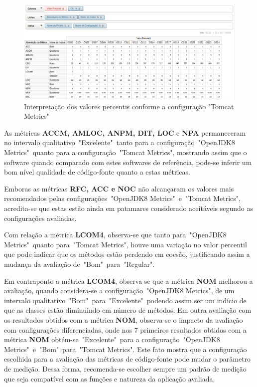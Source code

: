 \begin{figure}
\centering
\includegraphics[keepaspectratio=true,scale=0.7]{figuras/total-tomcat.eps}
\caption{Interpretação dos valores percentis conforme a configuração "Tomcat Metrics"}
\label{fig:total-tomcat}
\end{figure}
\FloatBarrier

As métricas \textbf{ACCM, AMLOC, ANPM, DIT, LOC} e \textbf{NPA} permaneceram no intervalo qualitativo~"Excelente"~tanto para a configuração~"OpenJDK8 Metrics"~quanto para a configuração~"Tomcat Metrics", mostrando assim que o software quando comparado com estes softwares de referência, pode-se inferir um bom nível qualidade de código-fonte quanto a estas métricas.

Emboras as métricas \textbf{RFC, ACC e NOC} não alcançaram os valores mais recomendados pelas configurações~"OpenJDK8 Metrics"~e~"Tomcat Metrics", acredita-se que estas estão ainda em patamares considerado aceitáveis segundo as configurações avaliadas. 

Com relação a métrica \textbf{LCOM4}, observa-se que tanto para~"OpenJDK8 Metrics"~quanto para~"Tomcat Metrics", houve uma variação no valor percentil que pode indicar que os métodos estão perdendo em coesão, justificando assim a mudança da avaliação de~"Bom"~para~"Regular".

Em contraponto a métrica \textbf{LCOM4}, observa-se que a métrica \textbf{NOM} melhorou a avaliação, quando considera-se a configuração~"OpenJDK8 Metrics", de um intervalo qualitativo~"Bom"~para~"Excelente"~podendo assim ser um indício de que as classes estão diminuindo em número de métodos. Em outra avaliação com os resultados obtidos com a métrica \textbf{NOM}, observa-se o impacto da avaliação com configurações diferenciadas, onde  nos 7 primeiros resultados obtidos com a métrica \textbf{NOM} obtém-se~"Excelente"~para a configuração~"OpenJDK8 Metrics"~e~"Bom"~para~"Tomcat Metrics". Este fato mostra que a configuração escolhida para a avaliação das métricas de código-fonte pode mudar o parâmetro de medição. Dessa forma, recomenda-se escolher sempre um padrão de medição que seja compatível com as funções e natureza da aplicação avaliada.


